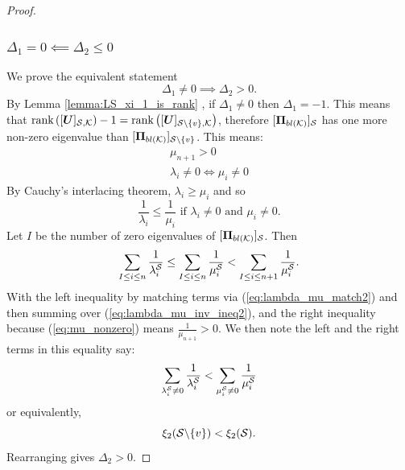\begin{proof}
\subsubsection{\texorpdfstring{$\Delta_{1} = 0 \impliedby \Delta_{2} \leq 0$}{\textDelta\textoneinferior = 0 <== \textDelta\texttwoinferior =< 0}} We prove the equivalent statement
\begin{equation}
    \Delta_{1} \neq 0 \implies \Delta_{2} > 0 .
\end{equation}
By Lemma \ref{lemma:LS_xi_1_is_rank} , if $\Delta_{1} \neq 0$ then $ \Delta_{1} = -1$. This means that  $\rank{\matrsubU{S}} -1 = \rank{\matrsubUGen{\set{S} \backslash \{v\}}}$, therefore $\projbl[S]$ has one more non-zero eigenvalue than $[\bm{\Pi}_{bl(\mathcal{K})}]_{\mathcal{S} \backslash \{v\}}$. This means:
\begin{align}
    \mu_{n+1} > 0 \label{eq:mu_nonzero} \\
    \lambda_{i} \neq 0 \iff \mu_{i} \neq 0 \label{eq:lambda_mu_match2}
\end{align}
By Cauchy's interlacing theorem, $\lambda_i \geq \mu_i$ and so
\begin{equation}
        \frac{1}{\lambda_{i}} \leq \frac{1}{\mu_{i}} \text{ if } \lambda_{i} \neq 0 \text{ and } \mu_{i} \neq 0.  \label{eq:lambda_mu_inv_ineq2}
    \end{equation}
    Let $I$ be the number of zero eigenvalues of $\projbl[S]$. Then 
\begin{equation}
    \sum_{I\leq i \leq n} { \frac{1}{\lambda_{i}^{\mathcal{S}}}} \leq \sum_{I\leq i \leq n} { \frac{1}{\mu_{i}^{\mathcal{S}}}} <  \sum_{I \leq i \leq n+1} { \frac{1}{\mu_{i}^{\mathcal{S}}}}. \label{eq:eig_sum_ineq2_intermediate}
\end{equation}
With the left inequality by matching terms via (\ref{eq:lambda_mu_match2}) and then summing over (\ref{eq:lambda_mu_inv_ineq2}), and the right inequality because (\ref{eq:mu_nonzero}) means $\frac{1}{\mu_{n+1}} > 0$. We then note the left and the right terms in this equality say:
\begin{equation}
     \sum_{\lambda_{i}^{\mathcal{S}} \neq 0} { \frac{1}{\lambda_{i}^{\mathcal{S}}}} < \sum_{\mu_{i}^{\mathcal{S}} \neq 0} { \frac{1}{\mu_{i}^{\mathcal{S}}}} \label{eq:eig_sum_ineq2}
 \end{equation}
or equivalently,
\begin{equation}
 \xi_{2}(\mathcal{S} \backslash \{v\}) < \xi_{2}(\mathcal{S}).   
\end{equation}
Rearranging gives $\Delta_{2} > 0$.
\end{proof}



